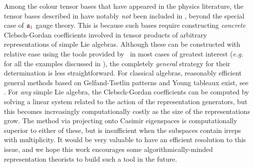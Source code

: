 \documentclass[12pt,a4paper]{article}\let\ifpdf\relax
\begin{document}
Among the colour tensor bases that have appeared in the physics literature, the tensor bases described in \cite{Bourjaily:2025hvq} have notably \emph{not} been included in \rpackage, beyond the special case of $\mathfrak{a}_{\r{1}}$ gauge theory. This is because such bases require constructing \emph{concrete} Clebsch-Gordan coefficients involved in tensor products of arbitrary representations of simple Lie algebras. Although these can be constructed with relative ease using the tools provided by \rpackage~in most cases of greatest interest (\emph{e.g.} for all the examples discussed in \cite{Bourjaily:2025hvq}), the completely \emph{general} strategy for their determination is less straightforward. For classical algebras, reasonably efficient general methods based on Gelfand-Tsetlin patterns and Young tableaux exist, see \cite{Alex:2011}. For \emph{any} simple Lie algebra, the Clebsch-Gordan coefficients can be computed by solving a linear system related to the action of the representation generators, but this becomes increasingly computationally costly as the size of the representations grow. The method via projecting onto Casimir eigenspaces is computationally superior to either of these, but is insufficient when the subspaces contain irreps with multiplicity. It would be very valuable to have an efficient resolution to this issue, and we hope this work encourages some algorithmically-minded representation theorists to build such a tool in the future. 



\vspace{\fill}\vspace{-4pt}
\end{document}
